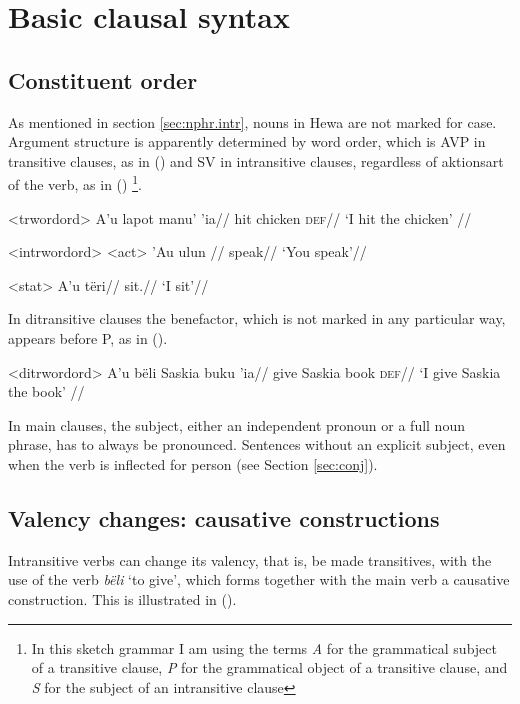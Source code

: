 \documentclass[12pt]{article}
\begin{document}
\section{Basic clausal syntax}

\subsection{Constituent order}

As mentioned in section \ref{sec:nphr.intr}, nouns in Hewa are not marked for case. Argument structure is apparently determined by word order, which is AVP in transitive clauses, as in () and SV in intransitive clauses, regardless of aktionsart of the verb, as in () \footnote{In this sketch grammar I am using the terms \textit{A} for the grammatical subject of a transitive clause, \textit{P} for the grammatical object of a transitive clause, and \textit{S} for the subject of an intransitive clause}.

\ex<trwordord>
\begingl %
\gla A'u lapot manu' 'ia//
\glb \First{}\Sg{} hit chicken \textsc{def}//
\glft `I hit the chicken' // 
\endgl
\xe

\pex<intrwordord> %
\a<act> %
\begingl %
\gla 'Au ulun //
\glb \Second{}\Sg{} speak//
\glft `You speak'//
\endgl

\a<stat> %
\begingl %
\gla A'u tëri//
\glb \First{}\Sg{} sit.\First{}\Sg//
\glft `I sit'// 
\endgl
\xe

In ditransitive clauses the benefactor, which is not marked in any particular way, appears before P, as in ().

\ex<ditrwordord>
\begingl %
\gla A'u bëli Saskia buku 'ia//
\glb \First{}\Sg{} give Saskia book \textsc{def}//
\glft `I give Saskia the book' // 
\endgl
\xe 

In main clauses, the subject, either an independent pronoun or a full noun phrase, has to always be pronounced. Sentences without an explicit subject, even when the verb is inflected for person (see Section \ref{sec:conj}).

\subsection{Valency changes: causative constructions}

Intransitive verbs can change its valency, that is, be made transitives, with the use of the verb \textit{bëli} `to give', which forms together with the main verb a causative construction. This is illustrated in ().
\end{document}
